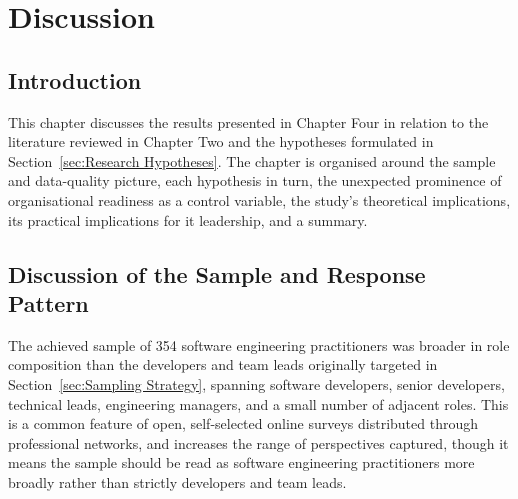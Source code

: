 \chapter{Discussion} %
\label{cha:ch5_discussion} %

\section{Introduction}
\label{sec:Ch5 Introduction}
This chapter discusses the results presented in Chapter Four in relation to the literature reviewed in Chapter Two and the hypotheses formulated in Section~\ref{sec:Research Hypotheses}. The chapter is organised around the sample and data-quality picture, each hypothesis in turn, the unexpected prominence of organisational readiness as a control variable, the study's theoretical implications, its practical implications for \gls{it} leadership, and a summary.

\section{Discussion of the Sample and Response Pattern}
\label{sec:Discussion of the Sample}
The achieved sample of 354 software engineering practitioners was broader in role composition than the developers and team leads originally targeted in Section~\ref{sec:Sampling Strategy}, spanning software developers, senior developers, technical leads, engineering managers, and a small number of adjacent roles. This is a common feature of open, self-selected online surveys distributed through professional networks, and increases the range of perspectives captured, though it means the sample should be read as software engineering practitioners more broadly rather than strictly developers and team leads.

